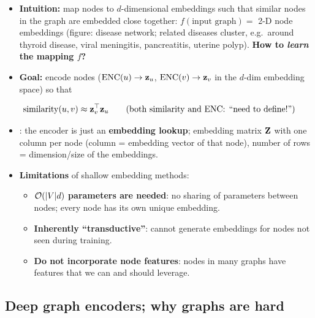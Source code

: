 \begin{itemize}
  \item \textbf{Intuition:} map nodes to $d$-dimensional embeddings such that
    similar nodes in the graph are embedded close together:
    $f(\text{input graph}) = $ 2-D node embeddings (figure: disease network;
    related diseases cluster, e.g.\ around thyroid disease, viral meningitis,
    pancreatitis, uterine polyp). \textbf{How to \emph{learn} the mapping $f$?}
  \item \textbf{Goal:} encode nodes ($\operatorname{ENC}(u)\to\mathbf{z}_u$, $\operatorname{ENC}(v)\to\mathbf{z}_v$ in the
    $d$-dim embedding space) so that
\end{itemize}
\begin{equation}\label{eq:lec03-recap}
  \operatorname{similarity}(u,v) \approx \mathbf{z}_v^{\top}\mathbf{z}_u
  \qquad\text{(both $\operatorname{similarity}$ and $\operatorname{ENC}$: ``need to define!'')}
\end{equation}
\begin{itemize}
  \item {}: the encoder is just an \textbf{embedding
    lookup}; embedding matrix $\mathbf{Z}$ with one column per node (column =
    embedding vector of that node), number of rows = dimension/size of the
    embeddings.
  \item \textbf{Limitations} of shallow embedding methods:
    \begin{itemize}
      \item \textbf{$\mathcal{O}(|V|d)$ parameters are needed}: no sharing of
        parameters between nodes; every node has its own unique embedding.
      \item \textbf{Inherently ``transductive''}: cannot generate embeddings for
        nodes not seen during training.
      \item \textbf{Do not incorporate node features}: nodes in many graphs have
        features that we can and should leverage.
    \end{itemize}
\end{itemize}

\subsection{Deep graph encoders; why graphs are hard}\label{sec:lec03-deep}

